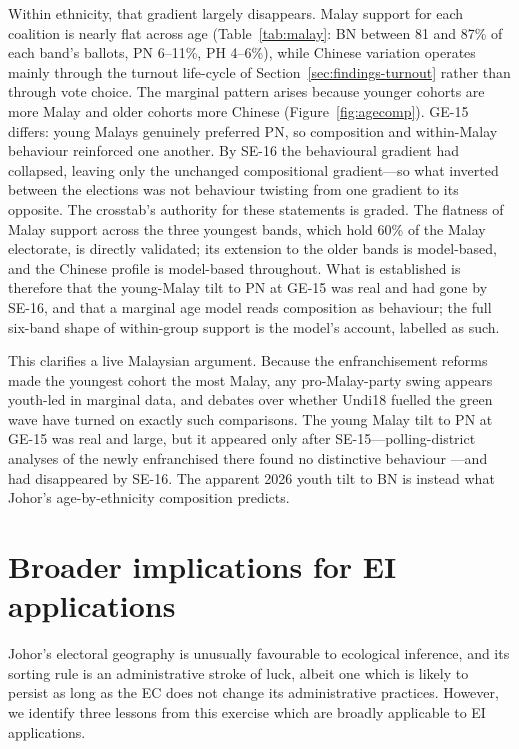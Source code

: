 \documentclass[11pt]{article}
\begin{document}
Within ethnicity, that gradient largely disappears. Malay support for each coalition is nearly flat across age (Table~\ref{tab:malay}: BN between 81 and 87\% of each band's ballots, PN 6--11\%, PH 4--6\%), while Chinese variation operates mainly through the turnout life-cycle of Section~\ref{sec:findings-turnout} rather than through vote choice. The marginal pattern arises because younger cohorts are more Malay and older cohorts more Chinese (Figure~\ref{fig:agecomp}). GE-15 differs: young Malays genuinely preferred PN, so composition and within-Malay behaviour reinforced one another. By SE-16 the behavioural gradient had collapsed, leaving only the unchanged compositional gradient---so what inverted between the elections was not behaviour twisting from one gradient to its opposite. The crosstab's authority for these statements is graded. The flatness of Malay support across the three youngest bands, which hold 60\% of the Malay electorate, is directly validated; its extension to the older bands is model-based, and the Chinese profile is model-based throughout. What is established is therefore that the young-Malay tilt to PN at GE-15 was real and had gone by SE-16, and that a marginal age model reads composition as behaviour; the full six-band shape of within-group support is the model's account, labelled as such.

This clarifies a live Malaysian argument. Because the enfranchisement reforms made the youngest cohort the most Malay, any pro-Malay-party swing appears youth-led in marginal data, and debates over whether Undi18 fuelled the green wave have turned on exactly such comparisons. The young Malay tilt to PN at GE-15 was real and large, but it appeared only after SE-15---polling-district analyses of the newly enfranchised there found no distinctive behaviour \cite{zhanghutchinson2022}---and had disappeared by SE-16. The apparent 2026 youth tilt to BN is instead what Johor's age-by-ethnicity composition predicts.

\section{Broader implications for EI applications}
\label{sec:implications}

Johor's electoral geography is unusually favourable to ecological inference, and its sorting rule is an administrative stroke of luck, albeit one which is likely to persist as long as the EC does not change its administrative practices. However, we identify three lessons from this exercise which are broadly applicable to EI applications.
\end{document}
